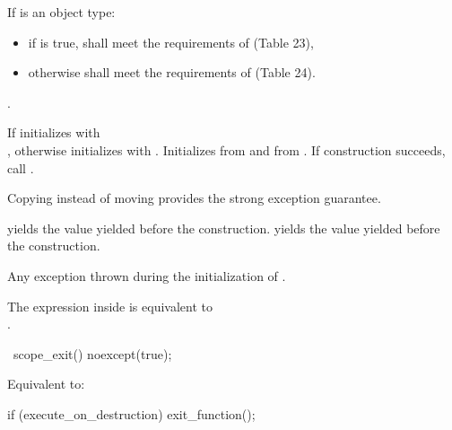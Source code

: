 \documentclass[ebook,11pt,article]{memoir}
\begin{document}
\begin{itemdescr}
\pnum
\requires %
If  is an object type:
\begin{itemize}
 \item
if  is true,  shall meet the requirements of  (Table 23), 
\item
otherwise  shall meet the requirements of  (Table 24).
\end{itemize}

\pnum
\constraints
{}.

\pnum
\effects %
If  initializes  with \\
,
otherwise initializes  with . Initializes  from  and  from .
If construction succeeds, call .
\begin{note}
Copying instead of moving provides the strong exception guarantee.
\end{note}


\pnum
\ensures
{} yields the value  yielded before the construction. 
 yields the value  yielded before the construction.

\pnum
\throws Any exception thrown during the initialization of .

\pnum
\remarks 
The expression inside  is equivalent to \\
.
\end{itemdescr}

\begin{itemdecl}
~scope_exit() noexcept(true);
\end{itemdecl}

\begin{itemdescr}
\pnum
\effects 
Equivalent to:
\begin{codeblock}
if (execute_on_destruction)
	exit_function();
\end{codeblock}
\end{itemdescr}
\end{document}
